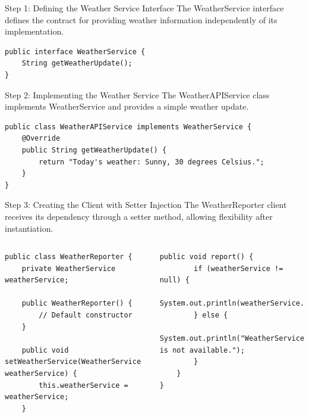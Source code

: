 \documentclass[aspectratio=169, table]{beamer}
\begin{document}
\begin{frame}[fragile]{Step 1: Defining the Weather Service Interface}
\vspace{20pt}
The WeatherService interface defines the contract for providing weather information independently of its implementation.

\begin{lstlisting}[style=JavaStyle]
public interface WeatherService {
	String getWeatherUpdate();
}
\end{lstlisting}
\end{frame}

\begin{frame}[fragile]{Step 2: Implementing the Weather Service}
\vspace{20pt}
The WeatherAPIService class implements WeatherService and provides a simple weather update.

\begin{lstlisting}[style=JavaStyle]
public class WeatherAPIService implements WeatherService {
	@Override
	public String getWeatherUpdate() {
		return "Today's weather: Sunny, 30 degrees Celsius.";
	}
}
\end{lstlisting}
\end{frame}

\begin{frame}[fragile]{Step 3: Creating the Client with Setter Injection}
\vspace{20pt}
The WeatherReporter client receives its dependency through a setter method, allowing flexibility after instantiation.

\begin{columns}[T]
\begin{lstlisting}[style=JavaStyle]
public class WeatherReporter {
	private WeatherService weatherService;
	
	public WeatherReporter() {
		// Default constructor
	}
	
	public void setWeatherService(WeatherService weatherService) {
		this.weatherService = weatherService;
	}
\end{lstlisting}

\begin{lstlisting}[style=JavaStyle, firstnumber=11]
	public void report() {
		if (weatherService != null) {
			System.out.println(weatherService.getWeatherUpdate());
		} else {
			System.out.println("WeatherService is not available.");
		}
	}
}
\end{lstlisting}
\end{columns}
\end{frame}
\end{document}

